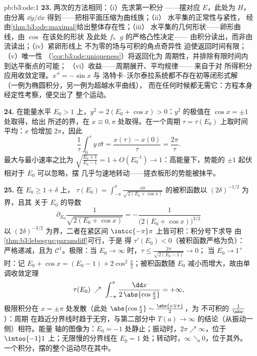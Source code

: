 \begin{solution}{pb:b3:ode:1}
\textbf{23.} 两次的方法相同：（i）先求第一积分
——摆对应 $E$，此处为 $H$，由分离
$\dd y/\dd x$ 得到——把相平面压缩为曲线族；（ii）
水平集的正常性与紧性，
经由\cref{thm:b3:ode:maximal}给出整体存在性；（iii）
水平集的几何形状——卵形曲线，由 $\cos$ 在该处的形状
及此处 $f$、$g$ 的严格凸性决定——
由积分读出，而非由流读出；（iv）紧卵形线上
不为零的场与可积的角点奇异性
迫使返回时间有限；（v）唯一性
（\cref{cor:b3:ode:uniqueness}）将返回化为
周期性，并排除有限时间内到达平衡点的可能；
（vi）收益——周期展开、平均规律——
来自于对
所得积分应用收敛定理。$x'' = -\sin x$ 与
洛特卡–沃尔泰拉系统都不存在初等闭形式解
（一例为椭圆积分，另一例为超越水平曲线），
而在任何时候都无需它：方程本身
经定性考察，便交出了
整个运动。

\textbf{24.} 在能量水平 $E_0 > 1$ 上，$y^2 = 2(E_0 +
\cos x) > 0$：$y^2$ 的极值在 $\cos x = \pm1$ 处取得，给出
所述的界，在 $x \equiv 0, \pi$ 处取得。在一个周期
$\tau = \tau(E_0)$ 上取时间平均：$x$ 恰增加
$2\pi$，因此
\[
\frac1\tau\int_0^\tau y\,\dd t = \frac{x(\tau) -
x(0)}{\tau} = \frac{2\pi}\tau .
\]
最大与最小速率之比为 $\sqrt{\frac{E_0 + 1}{E_0 -
1}} = 1 + O(E_0^{-1}) \to 1$：高能量下，势能的
$\pm1$ 起伏相对于 $E_0$ 可以忽略，摆
几乎匀速地转动——搓衣板形的势能被抹平。

\textbf{25.} 在 $E_0 \geq 1 + \delta$ 上，
$\tau(E_0) = \int_{-\pi}^{\pi}\frac{\dd x}{\sqrt{2(E_0 +
\cos x)}}$ 的被积函数以 $(2\delta)^{-1/2}$ 为界，且其
关于 $E_0$ 的导数
\[
\partial_{E_0}\frac1{\sqrt{2(E_0 + \cos x)}}
= -\frac{1}{\bigl(2(E_0 + \cos x)\bigr)^{3/2}}
\]
以 $(2\delta)^{-3/2}$ 为界，二者在紧区间
$\intcc{-\pi}\pi$ 上皆可积：积分号下求导
由\cref{thm:b3:lebesgue:paramdiff}可行，于是
得 $\tau'(E_0) < 0$（被积函数严格为负）：
严格递减，且为 $\mathcal C^1$。极限：当 $E_0 \to
\infty$ 时，$\tau \leq \frac{2\pi}{\sqrt{2(E_0 - 1)}} \to 0$；
当 $E_0 \to 1^+$ 时：记 $E_0 + \cos x = (E_0 - 1) +
2\cos^2\frac x2$；被积函数随 $E_0$
减小而增大，故由单调收敛定理
\[
\tau(E_0) \;\nearrow\;
\int_{-\pi}^{\pi}\frac{\dd x}{2\,\abs{\cos\frac x2}}
= +\infty,
\]
极限积分在 $x = \pm\pi$ 处发散（此处
$\abs{\cos\frac x2} \sim \frac{\abs{x \mp \pi}}2$，为
不可积的 $\frac1{\abs\cdot}$）：周期
在趋近分界线时趋于无穷，与第二部分中 $T(a) \to
\infty$ 的结论（从振动一侧）相符。能量
轴的图像为：$E_0 = -1$ 处静止；振动时，$2\pi \nearrow
\infty$，位于 $\intoo{-1}1$ 上；无限慢的分界线在
$E_0 = 1$ 处；转动时，$\infty \searrow 0$，位于其外。
一个积分，摆的整个运动尽在其中。
\end{solution}
